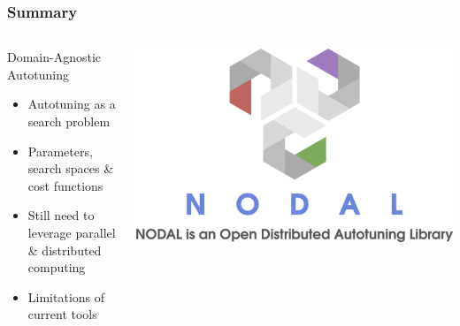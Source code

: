 \documentclass[10pt, compress, aspectratio=169]{beamer}
\begin{document}
\begin{frame}
    \frametitle{Summary}
    \begin{columns}[c]
        \begin{block}{Domain-Agnostic Autotuning}
            \begin{itemize}
                \item Autotuning as a \alert{search problem}
                \item \alert{Parameters}, \alert{search spaces} \& \alert{cost
                    functions}
                \item Still need to \alert{leverage parallel \& distributed
                    computing}
                \item \alert{Limitations} of current tools
            \end{itemize}
        \end{block}

        \pause

        \begin{center}
            \includegraphics[width=\columnwidth]{logo}
        \end{center}

    \end{columns}
\end{frame}

\maketitle
\end{document}
